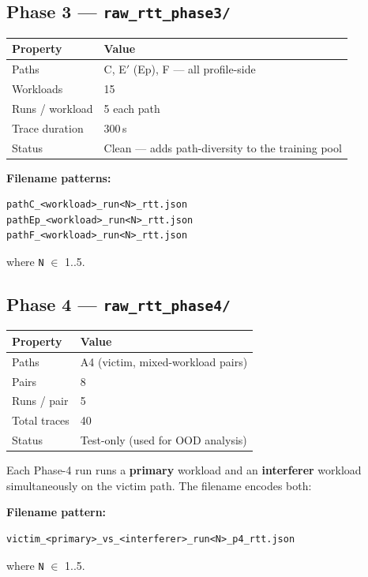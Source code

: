 \documentclass[11pt,a4paper]{article}
\begin{document}
\subsection{Phase 3 --- \texttt{raw\_rtt\_phase3/}}

\begin{tabular}{@{}ll@{}}
\toprule
\textbf{Property} & \textbf{Value} \\
\midrule
Paths              & C, E$'$ (Ep), F --- all profile-side \\
Workloads          & 15 \\
Runs / workload    & 5 each path \\
Trace duration     & 300\,s \\
Status             & Clean --- adds path-diversity to the training pool \\
\bottomrule
\end{tabular}

\textbf{Filename patterns:}
\begin{lstlisting}
pathC_<workload>_run<N>_rtt.json
pathEp_<workload>_run<N>_rtt.json
pathF_<workload>_run<N>_rtt.json
\end{lstlisting}
where \texttt{N} $\in$ 1..5.

\subsection{Phase 4 --- \texttt{raw\_rtt\_phase4/}}

\begin{tabular}{@{}ll@{}}
\toprule
\textbf{Property} & \textbf{Value} \\
\midrule
Paths           & A4 (victim, mixed-workload pairs) \\
Pairs           & 8 \\
Runs / pair     & 5 \\
Total traces    & 40 \\
Status          & Test-only (used for OOD analysis) \\
\bottomrule
\end{tabular}

Each Phase-4 run runs a \textbf{primary} workload and an \textbf{interferer}
workload simultaneously on the victim path. The filename encodes both:

\textbf{Filename pattern:}
\begin{lstlisting}
victim_<primary>_vs_<interferer>_run<N>_p4_rtt.json
\end{lstlisting}
where \texttt{N} $\in$ 1..5.
\end{document}
